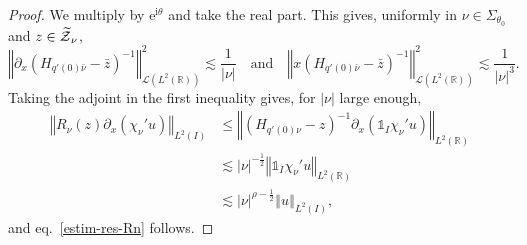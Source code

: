 \documentclass[AHL,Unicode,longabstracts,published]{cedram}
\newcommand{\abs}[1]{\left\vert #1\right\vert}
\newcommand{\nr}[1]{\left\Vert #1\right\Vert}
\renewcommand{\leq}{\leqslant}
\newcommand{\inv}{^{-1}}
\newcommand{\1}{\mathds 1}
\newcommand{\R}{\mathbb{R}}
\newcommand{\Lc}{{\mathcal L}}
\newcommand{\Zc}{\mathcal Z}
\newcommand{\eu}{\mathrm e}
\newcommand{\iu}{\mathrm i}
\renewcommand{\th}{\theta}
\let\oldtilde\tilde
\renewcommand*{\tilde}[1]{\mathchoice{\widetilde{#1}}{\widetilde{#1}}{\oldtilde{#1}}{\oldtilde{#1}}}
\begin{document}
\begin{proof}
We multiply by $\eu^{\iu\th}$ and take the real part. This gives, uniformly in $\nu \in \Sigma_{\th_0}$ and $z \in \tilde \Zc_\nu$,
\begin{equation}\label{eq:estim-partial-y-Hinv}
\nr{\partial_x \left(H_{q'(0)\bar \nu} - \bar z\right)\inv }_{\Lc\left(L^2(\R)\right)}^2 \lesssim \frac {1}{\abs \nu} \quad \text{and} \quad \nr{x \left(H_{q'(0)\bar \nu} - \bar z\right)\inv}_{\Lc\left(L^2(\R)\right)}^2 \lesssim \frac 1 {\abs \nu^3}.
\end{equation}
Taking the adjoint in the first inequality gives, for $\abs \nu$ large enough,
\begin{align*}
\nr{R_\nu(z) \partial_x \left(\chi_\nu' u\right)}_{L^2(I)} &\leq \nr{\left(H_{q'(0)\nu} - z\right)\inv \partial_x \left(\1_I \chi_\nu' u\right)}_{L^2(\R)}\\
&\lesssim \abs \nu^{-\frac 12} \nr{\1_I \chi_\nu'u}_{L^2(\R)}\\
&\lesssim \abs\nu^{\rho-\frac 12} \nr{u}_{L^2(I)},
\end{align*}
and eq.~\eqref{estim-res-Rn} follows.



\end{proof}
\end{document}
